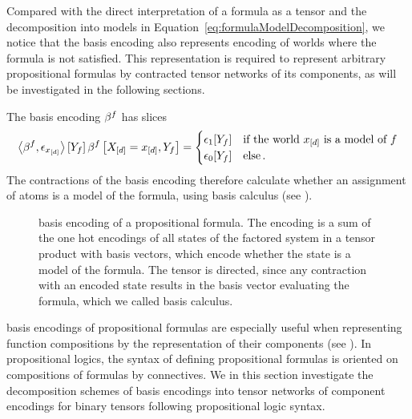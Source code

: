 Compared with the direct interpretation of a formula as a tensor and the decomposition into models in Equation~\ref{eq:formulaModelDecomposition}, we notice that the basis encoding also represents encoding of worlds where the formula is not satisfied.
This representation is required to represent arbitrary propositional formulas by contracted tensor networks of its components, as will be investigated in the following sections.

The basis encoding $\beta^{f}$ has slices
\begin{align*}
	\left\langle \beta^{f},\epsilon_{x_{[d]}}\right\rangle \left[ Y_{f} \right]
		\beta^{f}\left[X_{[d]}=x_{[d]},Y_{f}\right]
	= \begin{cases}
		\epsilon_1[Y_{f}] & \text{if the world $x_{[d]}$ is a model of $f$}  \\
		\epsilon_0[Y_{f}] & \text{else}\, .
		\end{cases}
\end{align*}
The contractions of the basis encoding therefore calculate whether an assignment of atoms is a model of the formula, using basis calculus (see ).

\begin{figure}[h]
\begin{center}
	
\end{center}
\caption{basis encoding of a propositional formula.
The encoding is a sum of the one hot encodings of all states of the factored system in a tensor product with basis vectors, which encode whether the state is a model of the formula.
The tensor is directed, since any contraction with an encoded state results in the basis vector evaluating the formula, which we called basis calculus.
}
\label{fig:formulabencoding}
\end{figure}



basis encodings of propositional formulas are especially useful when representing function compositions by the representation of their components (see ).
In propositional logics, the syntax of defining propositional formulas is oriented on compositions of formulas by connectives. %
We in this section investigate the decomposition schemes of basis encodings into tensor networks of component encodings for binary tensors following propositional logic syntax.

